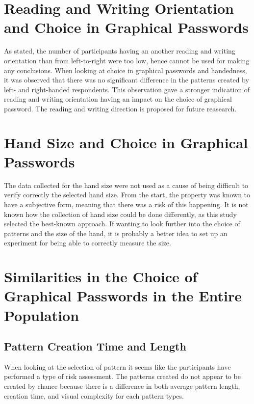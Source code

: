   \section{Reading and Writing Orientation and Choice in Graphical Passwords}
    As stated, the number of participants having an another reading and writing orientation than from left-to-right were too low, hence cannot be used for making any conclusions. When looking at choice in graphical passwords and handedness, it was observed that there was no significant difference in the patterns created by left- and right-handed respondents. This observation gave a stronger indication of reading and writing orientation having an impact on the choice of graphical password. The reading and writing direction is proposed for future reasearch. 

  \section{Hand Size and Choice in Graphical Passwords}
    The data collected for the hand size were not used as a cause of being difficult to verify correctly the selected hand size. From the start, the property was known to have a subjective form, meaning that there was a risk of this happening. It is not known how the collection of hand size could be done differently, as this study selected the best-known approach. If wanting to look further into the choice of patterns and the size of the hand, it is probably a better idea to set up an experiment for being able to correctly measure the size. 

  \clearpage
  \section{Similarities in the Choice of Graphical Passwords in the Entire Population}\label{sec:discussionEntirePopulation}

    \subsection{Pattern Creation Time and Length}

      When looking at the selection of pattern it seems like the participants have performed a type of risk assessment. The patterns created do not appear to be created by chance because there is a difference in both average pattern length, creation time, and visual complexity for each pattern types.

